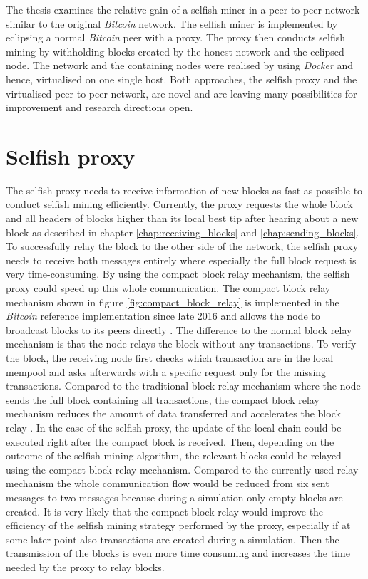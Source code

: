 The thesis examines the relative gain of a selfish miner in a peer-to-peer network similar to the original \textit{Bitcoin} network.
The selfish miner is implemented by eclipsing a normal \textit{Bitcoin} peer with a proxy.
The proxy then conducts selfish mining by withholding blocks created by the honest network and the eclipsed node.
The network and the containing nodes were realised by using \textit{Docker} and hence, virtualised on one single host.
Both approaches, the selfish proxy and the virtualised peer-to-peer network, are novel and are leaving many possibilities for improvement and research directions open.

\section{Selfish proxy}

The selfish proxy needs to receive information of new blocks as fast as possible to conduct selfish mining efficiently.
Currently, the proxy requests the whole block and all headers of blocks higher than its local best tip after hearing about a new block as described in chapter \ref{chap:receiving_blocks} and \ref{chap:sending_blocks}.
To successfully relay the block to the other side of the network, the selfish proxy needs to receive both messages entirely where especially the full block request is very time-consuming.
By using the compact block relay mechanism, the selfish proxy could speed up this whole communication.
The compact block relay mechanism shown in figure \ref{fig:compact_block_relay} is implemented in the \textit{Bitcoin} reference implementation since late 2016 \cite{bitcoin13} and allows the node to broadcast blocks to its peers directly \cite{bip152}.
The difference to the normal block relay mechanism is that the node relays the block without any transactions.
To verify the block, the receiving node first checks which transaction are in the local mempool and asks afterwards with a specific request only for the missing transactions.
Compared to the traditional block relay mechanism where the node sends the full block containing all transactions, the compact block relay mechanism reduces the amount of data transferred and accelerates the block relay \cite{bip152, ozisik2017graphene}.
In the case of the selfish proxy, the update of the local chain could be executed right after the compact block is received.
Then, depending on the outcome of the selfish mining algorithm, the relevant blocks could be relayed using the compact block relay mechanism.
Compared to the currently used relay mechanism the whole communication flow would be reduced from six sent messages to two messages because during a simulation only empty blocks are created.
It is very likely that the compact block relay would improve the efficiency of the selfish mining strategy performed by the proxy, especially if at some later point also transactions are created during a simulation.
Then the transmission of the blocks is even more time consuming and increases the time needed by the proxy to relay blocks.

